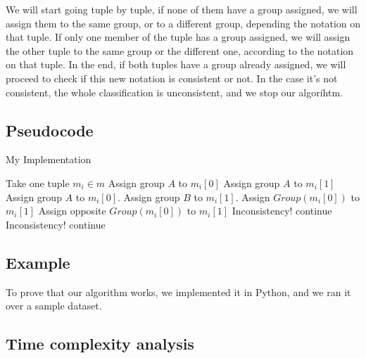 \documentclass{article}
\begin{document}
We will start going tuple by tuple, if none of them have a group assigned, we will assign them to the same group, or to a different group, depending the notation on that tuple. If only one member of the tuple has a group assigned, we will assign the other tuple to the same group or the different one, according to the notation on that tuple. In the end, if both tuples have a group already assigned, we will proceed to check if this new notation is consistent or not. In the case it's not consistent, the whole classification is unconsistent, and we stop our algorihtm.

\subsection*{Pseudocode}

\begin{algorithm}[H]
\caption{My Implementation}
\begin{algorithmic}[1]
 \State Take one tuple $m_i \in m$
   \State Assign group $A$ to $m_i[0]$
   \State Assign group $A$ to $m_i[1]$
   \State Assign group $A$ to $m_i[0]$.
   \State Assign group $B$ to $m_i[1]$.
  \EndIf
 \EndIf
   \State Assign $Group(m_i[0])$ to $m_i[1]$
   \State Assign opposite $Group(m_i[0])$ to $m_i[1]$
  \EndIf
 \EndIf
    \State Inconsistency!
   \Else
    \State continue
   \EndIf
    \State Inconsistency!
   \Else
    \State continue
   \EndIf
  \EndIf
 \EndIf
\EndWhile
\end{algorithmic}
\end{algorithm}

\subsection*{Example}

To prove that our algorithm works, we implemented it in Python, and we ran it over a sample dataset.




\subsection*{Time complexity analysis}
\end{document}
